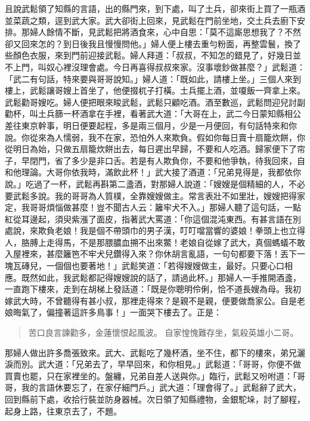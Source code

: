 且說武鬆領了知縣的言語，出的縣門來，到下處，叫了土兵，卻來街上買了一瓶酒並菜蔬之類，逕到武大家。武大卻街上回來，見武鬆在門前坐地，交土兵去廚下安排。那婦人餘情不斷，見武鬆把將酒食來，心中自思：「莫不這廝思想我了？不然卻又回來怎的？到日後我且慢慢問他。」婦人便上樓去重勻粉面，再整雲鬟，換了些顏色衣服，來到門前迎接武鬆。婦人拜道：「叔叔，不知怎的錯見了，好幾日並不上門，叫奴心裡沒理會處。今日再喜得叔叔來家。沒事壞鈔做甚麼？」武鬆道：「武二有句話，特來要與哥哥說知。」婦人道：「既如此，請樓上坐。」三個人來到樓上，武鬆讓哥嫂上首坐了，他便掇杌子打橫。土兵擺上酒，並嗄飯一齊拿上來。武鬆勸哥嫂吃。婦人便把眼來睃武鬆，武鬆只顧吃酒。酒至數巡，武鬆問迎兒討副勸杯，叫土兵篩一杯酒拿在手裡，看著武大道：「大哥在上，武二今日蒙知縣相公差往東京幹事，明日便要起程，多是兩三個月，少是一月便回，有句話特來和你說。你從來為人懦弱，我不在家，恐怕外人來欺負。假如你每日賣十扇籠炊餅，你從明日為始，只做五扇籠炊餅出去，每日遲出早歸，不要和人吃酒。歸家便下了帘子，早閉門，省了多少是非口舌。若是有人欺負你，不要和他爭執，待我回來，自和他理論。大哥你依我時，滿飲此杯！」武大接了酒道：「兄弟見得是，我都依你說。」吃過了一杯，武鬆再斟第二盞酒，對那婦人說道：「嫂嫂是個精細的人，不必要武鬆多說。我的哥哥為人質樸，全靠嫂嫂做主。常言表壯不如里壯，嫂嫂把得家定，我哥哥煩惱做甚麼！豈不聞古人云：籬牢犬不入。」那婦人聽了這句話，一點紅從耳邊起，須臾紫漲了面皮，指著武大罵道：「你這個混沌東西。有甚言語在別處說，來欺負老娘！我是個不帶頭巾的男子漢，叮叮噹當響的婆娘！拳頭上也立得人，胳膊上走得馬，不是那腲膿血搠不出來鱉！老娘自從嫁了武大，真個螞蟻不敢入屋裡來，甚麼籬笆不牢犬兒鑽得入來？你休胡言亂語，一句句都要下落！丟下一塊瓦磚兒，一個個也要著地！」武鬆笑道：「若得嫂嫂做主，最好。只要心口相應。既然如此，我武鬆都記得嫂嫂說的話了，請過此杯。」那婦人一手推開酒盞，一直跑下樓來，走到在胡梯上發話道：「既是你聰明伶俐，恰不道長嫂為母。我初嫁武大時，不曾聽得有甚小叔，那裡走得來？是親不是親，便要做喬家公。自是老娘晦氣了，偏撞著這許多鳥事！」一面哭下樓去了。正是：
\begin{quote}
苦口良言諫勸多，金蓮懷恨起風波。
自家惶愧難存坐，氣殺英雄小二哥。
\end{quote}

那婦人做出許多喬張致來。武大、武鬆吃了幾杯酒，坐不住，都下的樓來，弟兄灑淚而別。武大道：「兄弟去了，早早回來，和你相見。」武鬆道：「哥哥，你便不做買賣也罷，只在家裡坐的。盤纏，兄弟自差人送與你。」臨行，武鬆又吩咐道：「哥哥，我的言語休要忘了，在家仔細門戶。」武大道：「理會得了。」武鬆辭了武大，回到縣前下處，收拾行裝並防身器械。次日領了知縣禮物，金銀駝垛，討了腳程，起身上路，往東京去了，不題。

